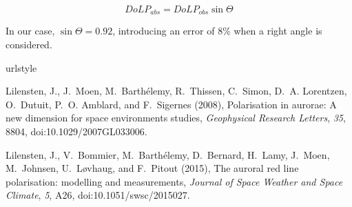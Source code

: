 \documentclass[draft,jgrga]{agutexSI}
\begin{document}
\begin{article}
\begin{equation}
DoLP_{abs} = DoLP_{obs} \sin\Theta  
\label{sintheta}
\end{equation}

In our case, $\sin\Theta = 0.92$, introducing an error of 8\% when a right angle is considered.

%
%
%
%
%
%
%
%
%

\begin{thebibliography}{12}
\providecommand{\natexlab}[1]{#1}
\expandafter\ifx\csname urlstyle\endcsname\relax
  \providecommand{\doi}[1]{doi:\discretionary{}{}{}#1}\else
  \providecommand{\doi}{doi:\discretionary{}{}{}\begingroup
  \urlstyle{rm}\Url}\fi

{Lilensten}, J., J.~{Moen}, M.~{Barth{\'e}lemy}, R.~{Thissen}, C.~{Simon},
  D.~A. {Lorentzen}, O.~{Dutuit}, P.~O. {Amblard}, and F.~{Sigernes} (2008),
  {Polarisation in aurorae: A new dimension for space environments studies},
  \textit{Geophysical Research Letters}, \textit{35}, 8804,
  \doi{10.1029/2007GL033006}.

{Lilensten}, J., V.~{Bommier}, M.~{Barth{\'e}lemy}, D.~{Bernard}, H.~{Lamy},
  J.~{Moen}, M.~{Johnsen}, U.~{L\o vhaug}, and F.~{Pitout} (2015), {The auroral red line polarisation: modelling and measurements},
  \textit{Journal of Space Weather and Space Climate},
  \textit{5}, A26, \doi{10.1051/swsc/2015027}.
  

\end{thebibliography}
\end{article}
\end{document}
